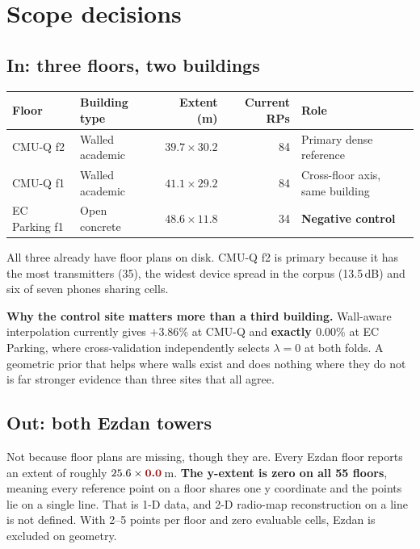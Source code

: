 \documentclass[11pt,a4paper]{article}
\newcommand{\B}[1]{\textcolor{bad}{\textbf{#1}}}
\newcommand{\G}[1]{\textcolor{good}{\textbf{#1}}}
\begin{document}
\section{Scope decisions}

\subsection{In: three floors, two buildings}

\begin{center}\small
\begin{tabular}{@{}llrrl@{}}
\toprule
Floor & Building type & Extent (m) & Current RPs & Role \\ \midrule
\rowcolor{green!8}CMU-Q f2 & Walled academic & $39.7\times30.2$ & 84 & Primary dense reference \\
CMU-Q f1 & Walled academic & $41.1\times29.2$ & 84 & Cross-floor axis, same building \\
EC Parking f1 & Open concrete & $48.6\times11.8$ & 34 & \textbf{Negative control} \\
\bottomrule
\end{tabular}
\end{center}

All three already have floor plans on disk. CMU-Q f2 is primary because it has the most
transmitters (35), the widest device spread in the corpus (13.5\,dB) and six of seven
phones sharing cells.

\textbf{Why the control site matters more than a third building.} Wall-aware
interpolation currently gives $+3.86\%$ at CMU-Q and \G{exactly $0.00\%$} at EC Parking,
where cross-validation independently selects $\lambda=0$ at both folds. A geometric prior
that helps where walls exist and does nothing where they do not is far stronger evidence
than three sites that all agree.

\subsection{Out: both Ezdan towers}

Not because floor plans are missing, though they are. Every Ezdan floor reports an extent
of roughly $25.6\times\B{0.0}$\,m. \textbf{The y-extent is zero on all 55 floors}, meaning
every reference point on a floor shares one y coordinate and the points lie on a single
line. That is 1-D data, and 2-D radio-map reconstruction on a line is not defined. With
2--5 points per floor and zero evaluable cells, Ezdan is excluded on geometry.
\end{document}
